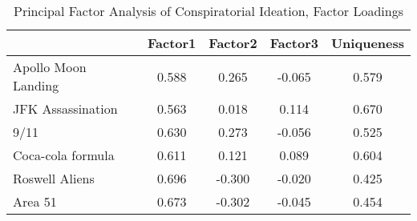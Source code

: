 \begin{table}[htbp]\centering
\def\sym#1{\ifmmode^{#1}\else\(^{#1}\)\fi}
\caption{Principal Factor Analysis of Conspiratorial Ideation, Factor Loadings}
\begin{tabular}{l*{1}{cccc}}
\hline\hline
                    &     Factor1&     Factor2&     Factor3&  Uniqueness\\
\hline
Apollo Moon Landing &       0.588&       0.265&      -0.065&       0.579\\
JFK Assassination   &       0.563&       0.018&       0.114&       0.670\\
9/11                &       0.630&       0.273&      -0.056&       0.525\\
Coca-cola formula   &       0.611&       0.121&       0.089&       0.604\\
Roswell Aliens      &       0.696&      -0.300&      -0.020&       0.425\\
Area 51             &       0.673&      -0.302&      -0.045&       0.454\\
\hline\hline
\end{tabular}
\end{table}
